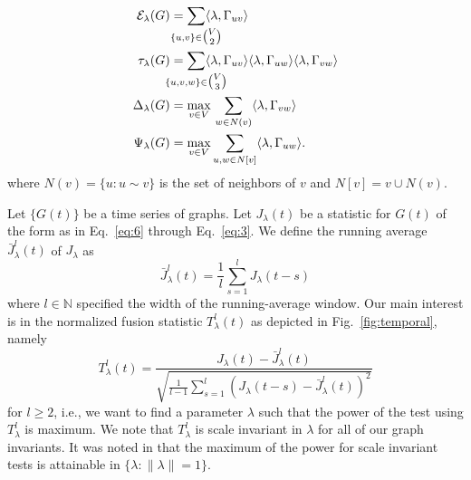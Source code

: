 \documentclass[10pt,journal,compsoc]{IEEEtran}
\theoremstyle{definition}
\def\clap#1{\hbox to 0pt{\hss#1\hss}}
\def\mathclap{\mathpalette\mathclapinternal}
\def\mathclapinternal#1#2{%
\clap{$\mathsurround=0pt#1{#2}$}%
}
\begin{document}
\begin{align}
  \label{eq:6}
  \mathcal{E}_{\lambda}(G) &= \sum_{\mathclap{\{u,v\} \in
      \tbinom{V}{2}}} \langle
  \lambda, \Gamma_{uv} \rangle \\
  \tau_{\lambda}(G) &= \sum_{\mathclap{\{u,v,w\} \in \tbinom{V}{3}}} \langle
  \lambda, \Gamma_{uv} \rangle \langle \lambda,
  \Gamma_{uw} \rangle \langle \lambda, \Gamma_{vw}
  \rangle \\ 
\Delta_{\lambda}(G) &= \max_{v \in V} \, \sum_{w \in N(v)} \langle
\lambda, \Gamma_{vw} \rangle \\
\label{eq:3}
  \Psi_{\lambda}(G) &= \max_{v \in V} \sum_{u,w \in N[v]} \langle
  \lambda, \Gamma_{uw} \rangle.
  \end{align}
  where $N(v) = \{u \colon u \sim v\}$ is the set of neighbors of
  $v$ and $N[v] = v \cup N(v)$.  

  Let $\{G(t)\}$ be a time series of graphs. Let $J_{\lambda}(t)$ be a
  statistic for $G(t)$ of the form as in Eq.~\eqref{eq:6} through
  Eq.~\eqref{eq:3}. We define the running average 
  $\bar{J}^{l}_\lambda(t)$ of $J_{\lambda}$ as
\begin{equation}
  \label{eq:4}
 \bar{J}^{l}_{\lambda}(t) = \frac{1}{l}\sum_{s = 1}^{l} J_{\lambda}(t - s) 
\end{equation}
where $l \in \mathbb{N}$ specified the width of the running-average
window. Our main interest is in the normalized fusion statistic
$T_{\lambda}^{l}(t)$ as depicted in Fig.~\ref{fig:temporal}, namely
\begin{equation}
  \label{eq:7}
 T_{\lambda}^{l}(t) = %
   \frac{J_{\lambda}(t) -
     \bar{J}_{\lambda}^{l}(t)}{\sqrt{\tfrac{1}{l-1}
       \sum_{s=1}^{l}(J_{\lambda}(t - s) - \bar{J}_{\lambda}^{l}(t))^2}}
\end{equation}
for $l \geq 2$, i.e., we want to find a parameter $\lambda$ such that
the power of the test using $T_{\lambda}^{l}$ is maximum. We note that
$T_{\lambda}^{l}$ is scale invariant in $\lambda$ for all of our graph
invariants. It was noted in \cite{lee11} that the maximum of the power
for scale invariant tests is attainable in $\{ \lambda \colon \|
\lambda \| = 1 \}$. \\ \\
\end{document}
